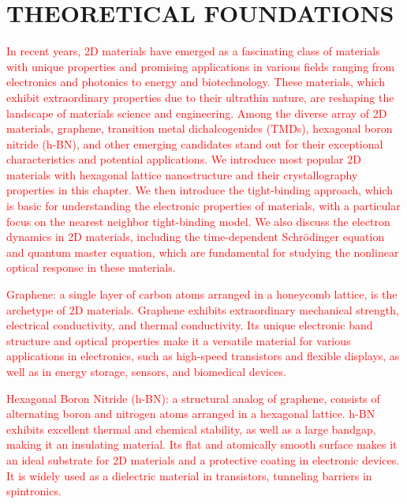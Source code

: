 %
\chapter{THEORETICAL FOUNDATIONS}
\label{ch:ch2}
\textcolor{red}{ In recent years, 2D materials have emerged as a fascinating class of materials with unique properties and promising applications in various fields ranging from electronics and photonics to energy and biotechnology. These materials, which exhibit extraordinary properties due to their ultrathin nature, are reshaping the landscape of materials science and engineering. Among the diverse array of 2D materials, graphene, transition metal dichalcogenides (TMDs), hexagonal boron nitride (\gls{h-BN}), and other emerging candidates stand out for their exceptional characteristics and potential applications. We introduce most popular 2D materials with hexagonal lattice nanostructure and their crystallography properties in this chapter. We then introduce the tight-binding approach, which is basic for understanding the electronic properties of materials, with a particular focus on the nearest neighbor tight-binding model. We also discuss the electron dynamics in 2D materials, including the time-dependent Schrödinger equation and quantum master equation, which are fundamental for studying the nonlinear optical response in these materials.}

\textcolor{red}{	Graphene: a single layer of carbon atoms arranged in a honeycomb lattice, is the archetype of 2D materials. Graphene exhibits extraordinary mechanical strength, electrical conductivity, and thermal conductivity. Its unique electronic band structure and optical properties make it a versatile material for various applications in electronics, such as high-speed transistors and flexible displays, as well as in energy storage, sensors, and biomedical devices.}

\textcolor{red}{Hexagonal Boron Nitride (\gls{h-BN}):  a structural analog of graphene, consists of alternating boron and nitrogen atoms arranged in a hexagonal lattice. \gls{h-BN} exhibits excellent thermal and chemical stability, as well as a large bandgap, making it an insulating material. Its flat and atomically smooth surface makes it an ideal substrate for 2D materials and a protective coating in electronic devices. It is widely used as a dielectric material in transistors, tunneling barriers in spintronics.}

